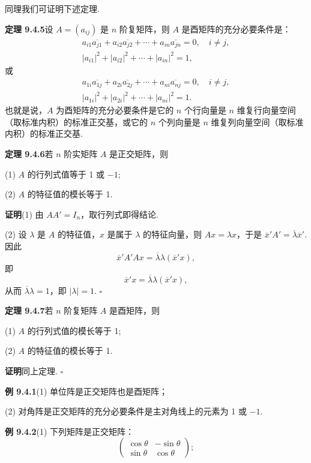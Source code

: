 \documentclass[UTF8,12pt,a4paper,fontset=fandol]{ctexart}
\begin{document}
同理我们可证明下述定理.

\noindent\textbf{定理 9.4.5}\quad 设 $A=(a_{ij})$ 是 $n$ 阶复矩阵，则 $A$ 是酉矩阵的充分必要条件是：
\[
\begin{gathered}
  a_{i1}\overline{a_{j1}}+a_{i2}\overline{a_{j2}}+\cdots+a_{in}\overline{a_{jn}}=0,\quad i\ne j,\\
  |a_{i1}|^2+|a_{i2}|^2+\cdots+|a_{in}|^2=1,
\end{gathered}
\]
或
\[
\begin{gathered}
  a_{1i}\overline{a_{1j}}+a_{2i}\overline{a_{2j}}+\cdots+a_{ni}\overline{a_{nj}}=0,\quad i\ne j,\\
  |a_{1i}|^2+|a_{2i}|^2+\cdots+|a_{ni}|^2=1.
\end{gathered}
\]
也就是说，$A$ 为酉矩阵的充分必要条件是它的 $n$ 个行向量是 $n$ 维复行向量空间（取标准内积）的标准正交基，或它的 $n$ 个列向量是 $n$ 维复列向量空间（取标准内积）的标准正交基.

\noindent\textbf{定理 9.4.6}\quad 若 $n$ 阶实矩阵 $A$ 是正交矩阵，则

(1) $A$ 的行列式值等于 1 或 $-1$;

(2) $A$ 的特征值的模长等于 1.

\noindent\textbf{证明}\quad (1) 由 $AA'=I_n$，取行列式即得结论.

(2) 设 $\lambda$ 是 $A$ 的特征值，$x$ 是属于 $\lambda$ 的特征向量，则 $Ax=\lambda x$，于是 $\overline x'A'=\overline\lambda\overline x'$. 因此
\[
  \overline x'A'Ax=\overline\lambda\lambda(\overline x'x),
\]
即
\[
  \overline x'x=\overline\lambda\lambda(\overline x'x),
\]
从而 $\overline\lambda\lambda=1$，即 $|\lambda|=1$. $\square$

\noindent\textbf{定理 9.4.7}\quad 若 $n$ 阶复矩阵 $A$ 是酉矩阵，则

(1) $A$ 的行列式值的模长等于 1;

(2) $A$ 的特征值的模长等于 1.

\noindent\textbf{证明}\quad 同上定理. $\square$

\noindent\textbf{例 9.4.1}\quad (1) 单位阵是正交矩阵也是酉矩阵；

(2) 对角阵是正交矩阵的充分必要条件是主对角线上的元素为 1 或 $-1$.

\noindent\textbf{例 9.4.2}\quad (1) 下列矩阵是正交矩阵：
\[
  \left(\begin{array}{cc}
    \cos\theta & -\sin\theta\\
    \sin\theta & \cos\theta
  \end{array}\right);
\]
\end{document}
